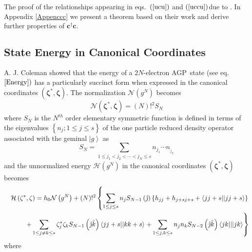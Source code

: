 \documentclass{article}
\begin{document}
The proof of the relationships appearing in eqs.\ $\left( \ref{ucu}\right) $
and $\left( \ref{uccu}\right) $due to \cite{Bloch1}\cite{Zumino1}\cite%
{Coleman2}. In Appendix \ref{Appenccc} we present a theorem based on their
work and derive further properties of $\mathbf{c}^{\dagger }\mathbf{c}$.

\subsection{State Energy in Canonical Coordinates}

A. J. Coleman showed \cite{Coleman2} that the energy of a $2N$-electron AGP\
state (see eq.$\ref{Energy})$ has a particularly succinct form when
expressed in the canonical coordinates $\left( \mathbf{\zeta }^{\ast },%
\mathbf{\zeta }\right) $. The normalization $\mathcal{N}\left( g^{N}\right) $
becomes 
\begin{equation}
\mathcal{N}\left( \mathbf{\zeta }^{\ast },\mathbf{\zeta }\right) =\left(
N\right) !^{2}S_{N}
\end{equation}%
where $S_{N}$ is the $N^{th}$ order elementary symmetric function is defined
in terms of the eigenvalues $\left\{ n_{j};1\leq j\leq s\right\} $ of the
one particle reduced density operator associated with the geminal $\left|
g\right\rangle $ as 
\begin{equation}
S_{N}=\sum_{1\leq j_{1}<j_{2}<\cdots <j_{N}\leq s}n_{j_{1}}\cdots
n_{_{j_{N}}}
\end{equation}%
and the unnormalized energy $\mathcal{H}\left( g^{N}\right) $ in the
canonical coordinates $\left( \mathbf{\zeta }^{\ast },\mathbf{\zeta }\right) 
$ becomes%
\begin{eqnarray}
&&\mathcal{H}\left( \mathbf{\zeta }^{\ast },\mathbf{\zeta }\right) =h_{0}%
\mathcal{N}\left( g^{N}\right) +\left( N\right) !^{2}\left\{ \sum_{1\leq
j\leq s}n_{j}S_{N-1}\left( \hat{\jmath}\right) \left\{
h_{jj}+h_{j+sj+s}+\left\langle jj+s||jj+s\right\rangle \right\} \right. 
\notag \\
&&\qquad +\sum_{1\leq j\neq k\leq s}\zeta _{j}^{\ast }\zeta
_{k}S_{N-1}\left( \hat{\jmath}\hat{k}\right) \left\langle
jj+s||kk+s\right\rangle \left. +\sum_{1\leq j,k\leq
s}n_{j}n_{k}S_{N-2}\left( \hat{\jmath}\hat{k}\right) \left\langle
jk|||jk\right\rangle \right\}  \label{canen}
\end{eqnarray}%
where 
\end{document}
